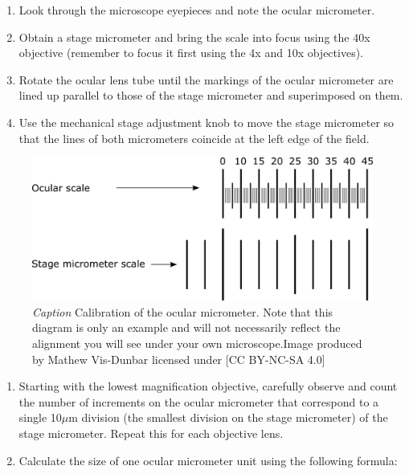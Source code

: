 \documentclass[
]{book}
\providecommand{\tightlist}{%
  \setlength{\itemsep}{0pt}\setlength{\parskip}{0pt}}
\begin{document}
\begin{enumerate}
\def\labelenumi{\arabic{enumi}.}
\tightlist
\item
  Look through the microscope eyepieces and note the ocular micrometer.
\item
  Obtain a stage micrometer and bring the scale into focus using the 40x objective (remember to focus it first using the 4x and 10x objectives).
\item
  Rotate the ocular lens tube until the markings of the ocular micrometer are lined up parallel to those of the stage micrometer and superimposed on them.
\item
  Use the mechanical stage adjustment knob to move the stage micrometer so that the lines of both micrometers coincide at the left edge of the field.
\end{enumerate}

\begin{figure}
\centering
\includegraphics{images/DM_ocular-micrometer-calibration.png}
\caption{\emph{Caption} Calibration of the ocular micrometer. Note that this diagram is only an example and will not necessarily reflect the alignment you will see under your own microscope.Image produced by Mathew Vis-Dunbar licensed under {[}CC BY-NC-SA 4.0{]}}
\end{figure}

\begin{enumerate}
\def\labelenumi{\arabic{enumi}.}
\setcounter{enumi}{4}
\tightlist
\item
  Starting with the lowest magnification objective, carefully observe and count the number of increments on the ocular micrometer that correspond to a single 10\(\mu\)m division (the smallest division on the stage micrometer) of the stage micrometer. Repeat this for each objective lens.
\item
  Calculate the size of one ocular micrometer unit using the following formula:
\end{enumerate}
\end{document}
